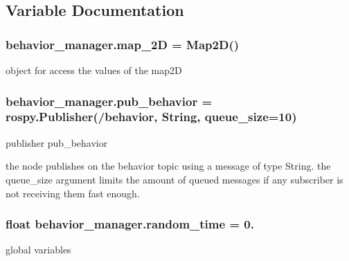 \subsection{Variable Documentation}
\subsubsection[{\texorpdfstring{map\+\_\+2D}{map_2D}}]{\setlength{\rightskip}{0pt plus 5cm}behavior\+\_\+manager.\+map\+\_\+2D = {\bf Map2D}()}\hypertarget{namespacebehavior__manager_afe2fe1010a2f35436221d7762966e6d7}{}\label{namespacebehavior__manager_afe2fe1010a2f35436221d7762966e6d7}


object for access the values of the map2D 

\subsubsection[{\texorpdfstring{pub\+\_\+behavior}{pub_behavior}}]{\setlength{\rightskip}{0pt plus 5cm}behavior\+\_\+manager.\+pub\+\_\+behavior = rospy.\+Publisher(\textquotesingle{}/behavior\textquotesingle{}, String, queue\+\_\+size=10)}\hypertarget{namespacebehavior__manager_ac30069bca00035c62a13df72bf29a3aa}{}\label{namespacebehavior__manager_ac30069bca00035c62a13df72bf29a3aa}


publisher pub\+\_\+behavior 

the node publishes on the behavior topic using a message of type String. the queue\+\_\+size argument limits the amount of queued messages if any subscriber is not receiving them fast enough. 
\subsubsection[{\texorpdfstring{random\+\_\+time}{random_time}}]{\setlength{\rightskip}{0pt plus 5cm}float behavior\+\_\+manager.\+random\+\_\+time = 0.}\hypertarget{namespacebehavior__manager_a53d496c1cdb4a1a21f698d78a6baeb6e}{}\label{namespacebehavior__manager_a53d496c1cdb4a1a21f698d78a6baeb6e}


global variables 

